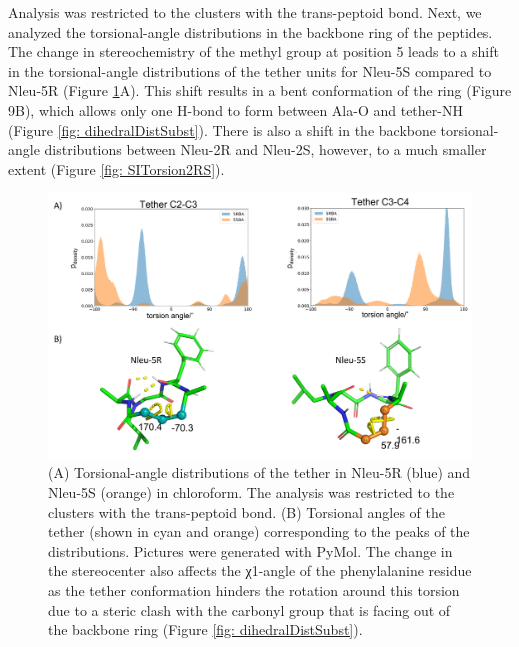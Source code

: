 Analysis was restricted to the clusters with the trans-peptoid bond.
Next, we analyzed the torsional-angle distributions in the backbone ring of the peptides. The change in stereochemistry of the methyl group at position 5 leads to a shift in the torsional-angle distributions of the tether units for Nleu-5S compared to Nleu-5R (Figure \ref{fig: dihedralDist}A). This shift results in a bent conformation of the ring (Figure 9B), which allows only one H-bond to form between Ala-O and tether-NH (Figure \ref{fig: dihedralDistSubst}). There is also a shift in the backbone torsional-angle distributions between Nleu-2R and Nleu-2S, however, to a much smaller extent (Figure \ref{fig: SITorsion2RS}).

\begin{figure}
    \centering
    \includegraphics[width=\textwidth]{7_chapter_5/fig/results/dihedral_dist.png}
    \caption{(A) Torsional-angle distributions of the tether in Nleu-5R (blue) and Nleu-5S (orange) in chloroform. The analysis was restricted to the clusters with the trans-peptoid bond. (B) Torsional angles of the tether (shown in cyan and orange) corresponding to the peaks of the distributions. Pictures were generated with PyMol. \cite{Delano2020} The change in the stereocenter also affects the χ1-angle of the phenylalanine residue as the tether conformation hinders the rotation around this torsion due to a steric clash with the carbonyl group that is facing out of the backbone ring (Figure \ref{fig: dihedralDistSubst}).}
    \label{fig: dihedralDist}
\end{figure}

